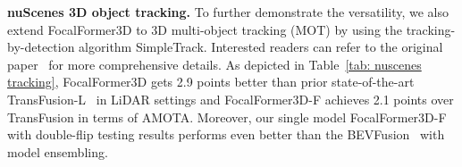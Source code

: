 \documentclass[10pt,twocolumn,letterpaper]{article}
\begin{document}
\vspace{2mm}
\noindent\textbf{nuScenes 3D object tracking.} 
To further demonstrate the versatility, we also extend FocalFormer3D to 3D multi-object tracking (MOT) by using the tracking-by-detection algorithm SimpleTrack. Interested readers can refer to the original paper~\cite{pang2021simpletrack} for more comprehensive details. As depicted in Table~\ref{tab: nuscenes tracking}, FocalFormer3D gets 2.9 points better than prior state-of-the-art TransFusion-L~\cite{transfusion} in LiDAR settings and FocalFormer3D-F achieves 2.1 points over TransFusion in terms of AMOTA. Moreover, our single model FocalFormer3D-F with double-flip testing results performs even better than the BEVFusion~\cite{bevfusionmit} with model ensembling.

\begin{table}[t]
	\begin{center}
\end{center}
\end{table}
\end{document}
